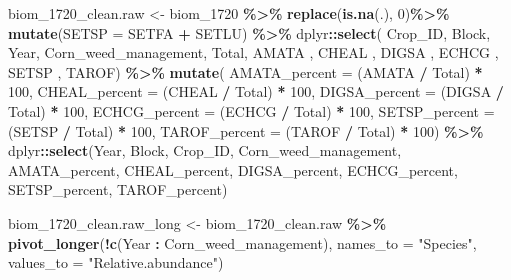 \documentclass[
]{article}
\newenvironment{Shaded}{\begin{snugshade}}{\end{snugshade}}
\newcommand{\AttributeTok}[1]{\textcolor[rgb]{0.13,0.29,0.53}{#1}}
\newcommand{\DecValTok}[1]{\textcolor[rgb]{0.00,0.00,0.81}{#1}}
\newcommand{\FunctionTok}[1]{\textcolor[rgb]{0.13,0.29,0.53}{\textbf{#1}}}
\newcommand{\NormalTok}[1]{#1}
\newcommand{\OtherTok}[1]{\textcolor[rgb]{0.56,0.35,0.01}{#1}}
\newcommand{\SpecialCharTok}[1]{\textcolor[rgb]{0.81,0.36,0.00}{\textbf{#1}}}
\newcommand{\StringTok}[1]{\textcolor[rgb]{0.31,0.60,0.02}{#1}}
\begin{document}
\begin{Shaded}
\begin{Highlighting}[]
\NormalTok{biom\_1720\_clean.raw }\OtherTok{\textless{}{-}}\NormalTok{ biom\_1720 }\SpecialCharTok{\%\textgreater{}\%} \FunctionTok{replace}\NormalTok{(}\FunctionTok{is.na}\NormalTok{(.), }\DecValTok{0}\NormalTok{)}\SpecialCharTok{\%\textgreater{}\%}
  \FunctionTok{mutate}\NormalTok{(}\AttributeTok{SETSP =}\NormalTok{ SETFA }\SpecialCharTok{+}\NormalTok{ SETLU) }\SpecialCharTok{\%\textgreater{}\%}
\NormalTok{  dplyr}\SpecialCharTok{::}\FunctionTok{select}\NormalTok{( Crop\_ID, Block, Year, Corn\_weed\_management, Total,}
\NormalTok{                AMATA , CHEAL , DIGSA , ECHCG , SETSP , TAROF) }\SpecialCharTok{\%\textgreater{}\%}
   \FunctionTok{mutate}\NormalTok{(}
    \AttributeTok{AMATA\_percent =}\NormalTok{ (AMATA }\SpecialCharTok{/}\NormalTok{ Total) }\SpecialCharTok{*} \DecValTok{100}\NormalTok{,}
    \AttributeTok{CHEAL\_percent =}\NormalTok{ (CHEAL }\SpecialCharTok{/}\NormalTok{ Total) }\SpecialCharTok{*} \DecValTok{100}\NormalTok{,}
    \AttributeTok{DIGSA\_percent =}\NormalTok{ (DIGSA }\SpecialCharTok{/}\NormalTok{ Total) }\SpecialCharTok{*} \DecValTok{100}\NormalTok{,}
    \AttributeTok{ECHCG\_percent =}\NormalTok{ (ECHCG }\SpecialCharTok{/}\NormalTok{ Total) }\SpecialCharTok{*} \DecValTok{100}\NormalTok{,}
    \AttributeTok{SETSP\_percent =}\NormalTok{ (SETSP }\SpecialCharTok{/}\NormalTok{ Total) }\SpecialCharTok{*} \DecValTok{100}\NormalTok{,}
    \AttributeTok{TAROF\_percent =}\NormalTok{ (TAROF }\SpecialCharTok{/}\NormalTok{ Total) }\SpecialCharTok{*} \DecValTok{100}\NormalTok{) }\SpecialCharTok{\%\textgreater{}\%}
\NormalTok{    dplyr}\SpecialCharTok{::}\FunctionTok{select}\NormalTok{(Year, Block, }
\NormalTok{                  Crop\_ID, Corn\_weed\_management, }
\NormalTok{                  AMATA\_percent, CHEAL\_percent, DIGSA\_percent,}
\NormalTok{                  ECHCG\_percent, SETSP\_percent, TAROF\_percent) }
\end{Highlighting}
\end{Shaded}

\begin{Shaded}
\begin{Highlighting}[]
\NormalTok{biom\_1720\_clean.raw\_long }\OtherTok{\textless{}{-}}\NormalTok{  biom\_1720\_clean.raw }\SpecialCharTok{\%\textgreater{}\%}
  \FunctionTok{pivot\_longer}\NormalTok{(}\SpecialCharTok{!}\FunctionTok{c}\NormalTok{(Year }\SpecialCharTok{:}\NormalTok{ Corn\_weed\_management),}
               \AttributeTok{names\_to =} \StringTok{"Species"}\NormalTok{,}
               \AttributeTok{values\_to =}  \StringTok{"Relative.abundance"}\NormalTok{)}
\end{Highlighting}
\end{Shaded}
\end{document}
